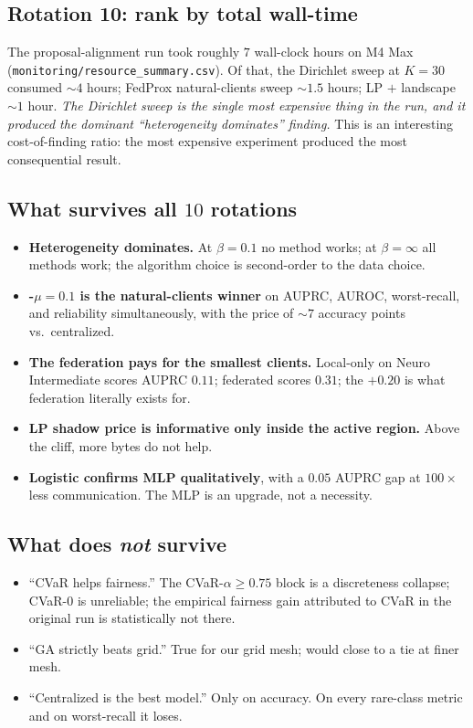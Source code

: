 \subsection{Rotation 10: rank by total wall-time}
The proposal-alignment run took roughly $7$ wall-clock hours on M4 Max
(\texttt{monitoring/resource\_summary.csv}). Of that, the Dirichlet sweep at
$K\!=\!30$ consumed $\sim 4$ hours; FedProx natural-clients sweep $\sim 1.5$
hours; LP $+$ landscape $\sim 1$ hour. \emph{The Dirichlet sweep is the
single most expensive thing in the run, and it produced the dominant
``heterogeneity dominates'' finding.} This is an interesting cost-of-finding
ratio: the most expensive experiment produced the most consequential result.

\subsection{What survives all $10$ rotations}
\begin{itemize}[leftmargin=*,nosep]
    \item \textbf{Heterogeneity dominates.} At $\beta\!=\!0.1$ no method
        works; at $\beta\!=\!\infty$ all methods work; the algorithm choice
        is second-order to the data choice.
    \item \textbf{\fedprox{}-$\mu\!=\!0.1$ is the natural-clients winner}
        on AUPRC, AUROC, worst-recall, and reliability simultaneously, with
        the price of $\sim\!7$ accuracy points vs.\ centralized.
    \item \textbf{The federation pays for the smallest clients.} Local-only
        on Neuro Intermediate scores AUPRC $0.11$; federated scores $0.31$;
        the $+0.20$ is what federation literally exists for.
    \item \textbf{LP shadow price is informative only inside the active region.}
        Above the cliff, more bytes do not help.
    \item \textbf{Logistic confirms MLP qualitatively}, with a $0.05$ AUPRC
        gap at $100\!\times$ less communication. The MLP is an upgrade, not
        a necessity.
\end{itemize}

\subsection{What does \emph{not} survive}
\begin{itemize}[leftmargin=*,nosep]
    \item ``CVaR helps fairness.'' The CVaR-$\alpha\!\geq\!0.75$ block is a
        discreteness collapse; CVaR-$0$ is unreliable; the empirical fairness
        gain attributed to CVaR in the original run is statistically not
        there.
    \item ``GA strictly beats grid.'' True for our grid mesh; would close to
        a tie at finer mesh.
    \item ``Centralized is the best model.'' Only on accuracy. On every
        rare-class metric and on worst-recall it loses.
\end{itemize}
